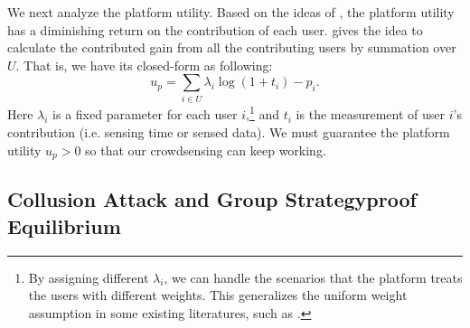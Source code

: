 \documentclass[conference]{IEEEtran}
\theoremstyle{definition}
\begin{document}
{We next analyze the platform utility. {Based on the ideas of \cite{yang2012crowdsourcing,luo2014profit,zhang2014free,liu2014social}}, the platform utility has a diminishing return on the contribution of each user. \cite{yan2015ifc} gives the idea to calculate the contributed gain from all the contributing users by summation over $U$. That is, we have its closed-form as following:
\begin{equation}
\label{eqn:plat_utility}
u_p=\sum_{i\in U}\lambda_i\log (1+t_i)-p_i.
\end{equation}
Here $\lambda_i$ is a fixed parameter for each user $i$,\footnote{By assigning different $\lambda_i$, we can handle the scenarios that the platform treats the users with different weights. This generalizes the uniform weight assumption in some existing literatures, such as \cite{yang2012crowdsourcing,zhang2014free}.} and $t_i$ is the measurement of user $i$\rq{}s contribution (i.e. sensing time or sensed data). We must guarantee the platform utility $u_p>0$ so that our crowdsensing can keep working.
}

\subsection{Collusion Attack and Group Strategyproof Equilibrium}
\end{document}
